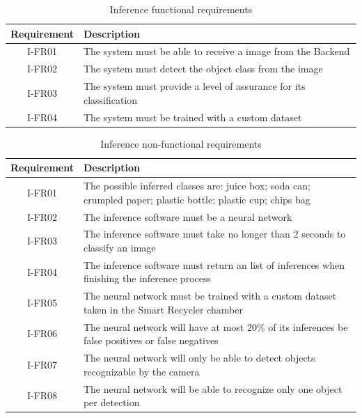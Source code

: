 \documentclass[a4paper,11pt]{article}
\begin{document}
\begin{table}[H]
  \caption{\small{Inference functional requirements}}
  \begin{center}
    \begin{tabular}{|c|p{95mm}|}
      \hline
      Requirement & Description                                                         \\ \hline
      I-FR01      & The system must be able to receive a image from the Backend         \\ \hline
      I-FR02      & The system must detect the object class from the image              \\ \hline
      I-FR03      & The system must provide a level of assurance for its classification \\ \hline
      I-FR04      & The system must be trained with a custom dataset                    \\ \hline
    \end{tabular}
  \end{center}
  \label{tab:Inf0}
\end{table}

\begin{table}[H]
  \caption{\small{Inference non-functional requirements}}
  \begin{center}
    \begin{tabular}{|c|p{95mm}|}
      \hline
      Requirement & Description                                                                                                    \\ \hline
      I-FR01      & The possible inferred classes are: juice box; soda can; crumpled paper; plastic bottle; plastic cup; chips bag \\ \hline
      I-FR02      & The inference software must be a neural network                                                                \\ \hline
      I-FR03      & The inference software must take no longer than 2 seconds to classify an image                                 \\ \hline
      I-FR04      & The inference software must return an list of inferences when finishing the inference process                  \\ \hline
      I-FR05      & The neural network must be trained with a custom dataset taken in the Smart Recycler chamber                   \\ \hline
      I-FR06      & The neural network will have at most 20\% of its inferences be false positives or false negatives              \\ \hline
      I-FR07      & The neural network will only be able to detect objects recognizable by the camera                              \\ \hline
      I-FR08      & The neural network will be able to recognize only one object per detection                                     \\ \hline
      \hline
    \end{tabular}
  \end{center}
  \label{tab:Inf1}
\end{table}
\end{document}
